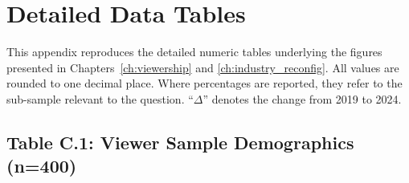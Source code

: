 \chapter{Detailed Data Tables}
\label{app:data_tables}

\noindent
This appendix reproduces the detailed numeric tables underlying the
figures presented in Chapters~\ref{ch:viewership} and
\ref{ch:industry_reconfig}.  All values are rounded to one
decimal place.  Where percentages are reported, they refer to the
sub-sample relevant to the question.  ``$\Delta$'' denotes the
change from 2019 to 2024.

\section{Table C.1: Viewer Sample Demographics (n=400)}
